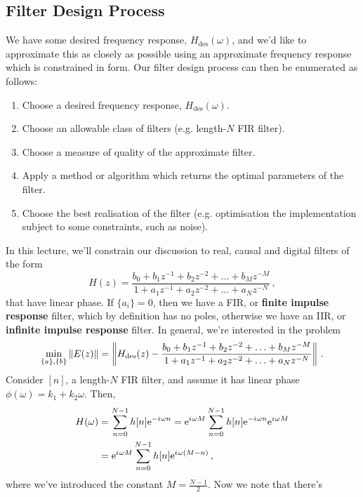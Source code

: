 \subsection{Filter Design Process}
%
We have some desired frequency response, $H_\mathrm{des}(\omega)$, and we'd
like to approximate this as closely as possible using an approximate frequency
response which is constrained in form. Our filter design process can then
be enumerated as follows:
%
\begin{enumerate}
\item Choose a desired frequency response, $H_\mathrm{des}(\omega)$.
\item Choose an allowable class of filters (e.g. length-$N$ FIR filter).
\item Choose a measure of quality of the approximate filter.
\item Apply a method or algorithm which returns the optimal parameters of the
  filter.
\item Choose the best realisation of the filter (e.g. optimisation the implementation
  subject to some constraints, such as noise).
\end{enumerate}
%
In this lecture, we'll constrain our discussion to real, causal and digital filters
of the form
%
\begin{displaymath}
  H(z) = \frac{
    b_0 + b_1z^{-1} + b_2z^{-2} + \hdots + b_Mz^{-M}
  }{
    1 + a_1z^{-1} + a_2z^{-2} + \hdots + a_Nz^{-N}
  } \,,
\end{displaymath}
%
that have linear phase. If $\{a_i\} = 0$, then we have a FIR, or
\textbf{finite impulse response} filter, which by definition has no poles, otherwise we
have an IIR, or \textbf{infinite impulse response} filter. In general, we're
interested in the problem
%
\begin{displaymath}
  \min_{\{a\},\{b\}} \left\lVert E(z)\right\rVert = \left\lVert H_\mathrm{des}(z) -
  \frac{
    b_0 + b_1z^{-1} + b_2z^{-2} + \hdots + b_Mz^{-M}
  }{
    1 + a_1z^{-1} + a_2z^{-2} + \hdots + a_Nz^{-N}
  }
  \right\rVert \,.
\end{displaymath}
%
Consider $[n]$, a length-$N$ FIR filter, and assume it has linear phase
$\phi(\omega) = k_1 + k_2\omega$. Then,
%
\begin{align*}
  H(\omega) &= \sum_{n=0}^{N-1}h[n]\mathrm{e}^{-{i\mkern1mu}\omega n}
  = \mathrm{e}^{{i\mkern1mu}\omega M}\sum_{n=0}^{N-1}h[n]\mathrm{e}^{-{i\mkern1mu}\omega n}\mathrm{e}^{{i\mkern1mu}\omega M} \\
  &= \mathrm{e}^{{i\mkern1mu}\omega M}\sum_{n=0}^{N-1}h[n]\mathrm{e}^{{i\mkern1mu}\omega(M - n)} \,,
\end{align*}
%
where we've introduced the constant $M = \frac{N-1}{2}$. Now we note that there's
